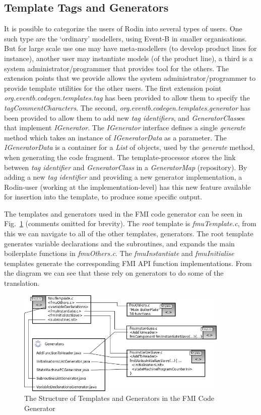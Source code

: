 \documentclass{llncs}%
\begin{document}
\subsection{Template Tags and Generators}
It is possible to categorize the users of Rodin into several types of users. One such type are the `ordinary' modellers, using Event-B in smaller organisations. But for large scale use one may have meta-modellers (to develop product lines for instance), another user may instantiate models (of the product line), a third is a system administrator/programmer that provides tool for the others. The extension points that we provide allows the system administrator/programmer to provide template utilities for the other users. The first extension point \\ \emph{org.eventb.codegen.templates.tag} has been provided to allow them to specify the \emph{tagCommentCharacters}. The second, \emph{org.eventb.codegen.templates.generator} has been provided to allow them to add new \emph{tag identifiers}, and \emph{GeneratorClass}es that implement \emph{IGenerator}. The \emph{IGenerator} interface defines a single \emph{generate} method which takes an instance of \emph{IGeneratorData} as a parameter. The \emph{IGeneratorData}  is a container for  a \emph{List} of objects, used by the \emph{generate} method, when generating the code fragment. The template-processor stores the link between \emph{tag identifier} and \emph{GeneratorClass} in a \emph{GeneratorMap} (repository). By adding a new \emph{tag identifier} and providing a new generator implementation, a Rodin-user (working at the implementation-level) has this new feature available for insertion into the template, to produce some specific output. 

The templates and generators used in the FMI code generator can be seen in Fig.~\ref{fig:templateStructure} (comments omitted for brevity). The \emph{root} template is \emph{fmuTemplate.c}, from this we can navigate to all of the other templates, generators. The root template generates variable declarations and the subroutines, and expands the main boilerplate functions in \emph{fmuOthers.c}. The \emph{fmuInstantiate} and \emph{fmuInitialise} templates generate the corresponding FMI API function implementations. From the diagram we can see that these rely on generators to do some of the translation.
%
\begin{figure}
\centering
\includegraphics[width=0.9\textwidth]{templateStructure.png}
\caption{The Structure of Templates and Generators in the FMI Code Generator}
\label{fig:templateStructure}
\end{figure}
%
\end{document}
